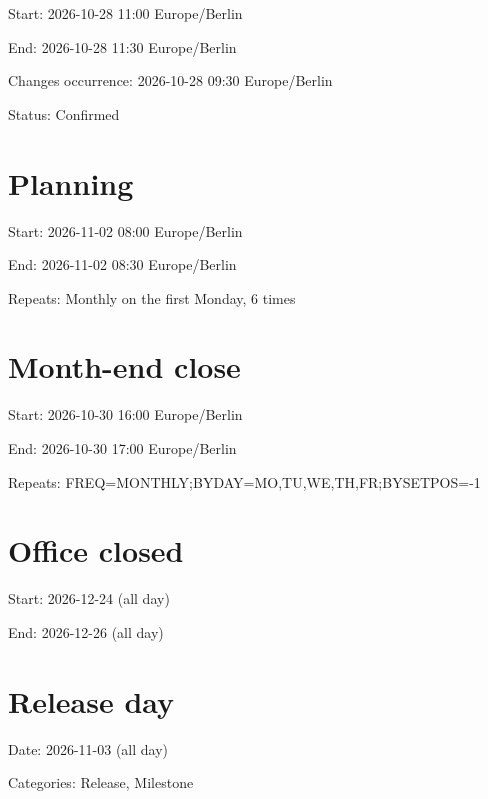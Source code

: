 \documentclass[11pt,a4paper]{article}
\begin{document}
Start: 2026-10-28 11:00 Europe/Berlin

End: 2026-10-28 11:30 Europe/Berlin

Changes occurrence: 2026-10-28 09:30 Europe/Berlin

Status: Confirmed

\section{Planning}

Start: 2026-11-02 08:00 Europe/Berlin

End: 2026-11-02 08:30 Europe/Berlin

Repeats: Monthly on the first Monday, 6 times

\section{Month-end close}

Start: 2026-10-30 16:00 Europe/Berlin

End: 2026-10-30 17:00 Europe/Berlin

Repeats: FREQ=MONTHLY;BYDAY=MO,TU,WE,TH,FR;BYSETPOS=-1

\section{Office closed}

Start: 2026-12-24 (all day)

End: 2026-12-26 (all day)

\section{Release day}

Date: 2026-11-03 (all day)

Categories: Release, Milestone
\end{document}
